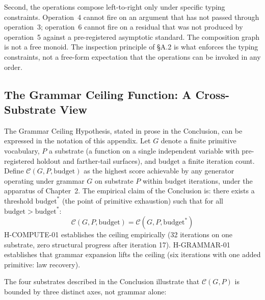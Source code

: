 \documentclass[11pt]{article}
\begin{document}
Second, the operations compose left-to-right only under specific typing constraints. Operation~4 cannot fire on an argument that has not passed through operation~3; operation~6 cannot fire on a residual that was not produced by operation~5 against a pre-registered asymptotic standard. The composition graph is not a free monoid. The inspection principle of \S A.2 is what enforces the typing constraints, not a free-form expectation that the operations can be invoked in any order.

\subsection*{The Grammar Ceiling Function: A Cross-Substrate View}

The Grammar Ceiling Hypothesis, stated in prose in the Conclusion, can be expressed in the notation of this appendix. Let $G$ denote a finite primitive vocabulary, $P$ a substrate (a function on a single independent variable with pre-registered holdout and farther-tail surfaces), and $\text{budget}$ a finite iteration count. Define $\mathcal{C}(G, P, \text{budget})$ as the highest score achievable by any generator operating under grammar $G$ on substrate $P$ within $\text{budget}$ iterations, under the apparatus of Chapter~2. The empirical claim of the Conclusion is: there exists a threshold $\text{budget}^*$ (the point of primitive exhaustion) such that for all $\text{budget} > \text{budget}^*$:
\[
\mathcal{C}(G, P, \text{budget}) = \mathcal{C}(G, P, \text{budget}^*)
\]
H-COMPUTE-01 establishes the ceiling empirically (32 iterations on one substrate, zero structural progress after iteration 17). H-GRAMMAR-01 establishes that grammar expansion lifts the ceiling (six iterations with one added primitive: law recovery).

The four substrates described in the Conclusion illustrate that $\mathcal{C}(G, P)$ is bounded by three distinct axes, not grammar alone:
\end{document}
